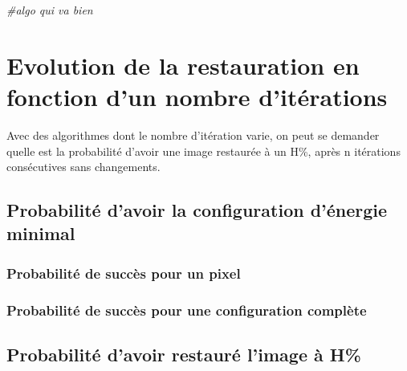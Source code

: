 \documentclass[
]{article}
\newenvironment{Shaded}{\begin{snugshade}}{\end{snugshade}}
\newcommand{\CommentTok}[1]{\textcolor[rgb]{0.56,0.35,0.01}{\textit{#1}}}
\begin{document}
\begin{Shaded}
\begin{Highlighting}[]
\CommentTok{\#algo qui va bien}
\end{Highlighting}
\end{Shaded}


\hypertarget{evolution-de-la-restauration-en-fonction-dun-nombre-dituxe9rations}{%
\section{Evolution de la restauration en fonction d'un nombre
d'itérations}\label{evolution-de-la-restauration-en-fonction-dun-nombre-dituxe9rations}}

Avec des algorithmes dont le nombre d'itération varie, on peut se
demander quelle est la probabilité d'avoir une image restaurée à un H\%,
après n itérations consécutives sans changements.

\hypertarget{probabilituxe9-davoir-la-configuration-duxe9nergie-minimal}{%
\subsection{Probabilité d'avoir la configuration d'énergie
minimal}\label{probabilituxe9-davoir-la-configuration-duxe9nergie-minimal}}

\hypertarget{probabilituxe9-de-succuxe8s-pour-un-pixel}{%
\subsubsection{Probabilité de succès pour un
pixel}\label{probabilituxe9-de-succuxe8s-pour-un-pixel}}

\hypertarget{probabilituxe9-de-succuxe8s-pour-une-configuration-compluxe8te}{%
\subsubsection{Probabilité de succès pour une configuration
complète}\label{probabilituxe9-de-succuxe8s-pour-une-configuration-compluxe8te}}

\hypertarget{probabilituxe9-davoir-restauruxe9-limage-uxe0-h}{%
\subsection{Probabilité d'avoir restauré l'image à
H\%}\label{probabilituxe9-davoir-restauruxe9-limage-uxe0-h}}
\end{document}
